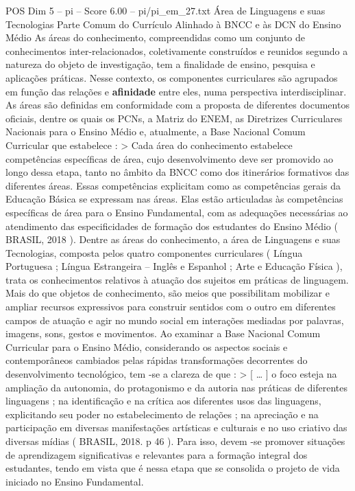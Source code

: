 \begin{textsample}{POS Dim 5 – pi – Score 6.00 – pi/pi\_em\_27.txt}  \label{ex:f5_pos_233}
Área de Linguagens e suas Tecnologias Parte Comum do Currículo Alinhado à BNCC e às DCN do Ensino Médio As áreas do conhecimento, compreendidas como um conjunto de conhecimentos inter-relacionados, coletivamente construídos e reunidos segundo a natureza do objeto de investigação, tem a finalidade de ensino, pesquisa e aplicações práticas.
Nesse contexto, os componentes curriculares são agrupados em função das relações e \textbf{afinidade} entre eles, numa perspectiva interdisciplinar.
As áreas são definidas em conformidade com a proposta de diferentes documentos oficiais, dentre os quais os PCNs, a Matriz do ENEM, as Diretrizes Curriculares Nacionais para o Ensino Médio e, atualmente, a Base Nacional Comum Curricular que estabelece : > Cada área do conhecimento estabelece competências específicas de área, cujo desenvolvimento deve ser promovido ao longo dessa etapa, tanto no âmbito da BNCC como dos itinerários formativos das diferentes áreas.
Essas competências explicitam como as competências gerais da Educação Básica se expressam nas áreas.
Elas estão articuladas às competências específicas de área para o Ensino Fundamental, com as adequações necessárias ao atendimento das especificidades de formação dos estudantes do Ensino Médio ( BRASIL, 2018 ).
Dentre as áreas do conhecimento, a área de Linguagens e suas Tecnologias, composta pelos quatro componentes curriculares ( Língua Portuguesa ; Língua Estrangeira – Inglês e Espanhol ; Arte e Educação Física ), trata os conhecimentos relativos à atuação dos sujeitos em práticas de linguagem.
Mais do que objetos de conhecimento, são meios que possibilitam mobilizar e ampliar recursos expressivos para construir sentidos com o outro em diferentes campos de atuação e agir no mundo social em interações mediadas por palavras, imagens, sons, gestos e movimentos.
Ao examinar a Base Nacional Comum Curricular para o Ensino Médio, considerando os aspectos sociais e contemporâneos cambiados pelas rápidas transformações decorrentes do desenvolvimento tecnológico, tem -se a clareza de que : > [ … ] o foco esteja na ampliação da autonomia, do protagonismo e da autoria nas práticas de diferentes linguagens ; na identificação e na crítica aos diferentes usos das linguagens, explicitando seu poder no estabelecimento de relações ; na apreciação e na participação em diversas manifestações artísticas e culturais e no uso criativo das diversas mídias ( BRASIL, 2018. p 46 ).
Para isso, devem -se promover situações de aprendizagem significativas e relevantes para a formação integral dos estudantes, tendo em vista que é nessa etapa que se consolida o projeto de vida iniciado no Ensino Fundamental.

\end{textsample}

